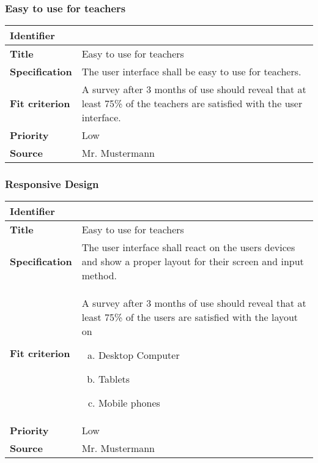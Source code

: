 
\newenvironment{requirement}[1]{
	\subsubsection{#1}
	\label{req:#1}

	\newcommand{\header}[1]{\textbf{##1}}

	\newcommand{\Identifier}{\hline \header{Identifier} & \header{\thesubsubsection} \\}
	\newcommand{\Title}{\hline \header{Title} & #1 \\}
	\newcommand{\Specification}[1]{\hline \header{Specification} & ##1 \\}
	\newcommand{\Category}[1]{\hline \header{Category} & ##1 \\}
	\newcommand{\FitCriterion}[1]{\hline \header{Fit criterion} & ##1 \\}
	\newcommand{\Source}[1]{\hline \header{Source} & ##1 \\}
	\newcommand{\Rationale}[1]{\hline \header{Rationale} & ##1 \\}
	\newcommand{\Interaction}[1]{\hline \header{Interaction} & ##1 \\}
	\newcommand{\Priority}[1]{\hline \header{Priority} & ##1 \\}
	\newcommand{\Stability}[1]{\hline \header{Stability} & ##1 \\}
	\newcommand{\High}{\Priority{Essential}}
	\newcommand{\Medium}{\Priority{Medium}}
	\newcommand{\Low}{\Priority{Low}}

	\begin{tabular}{|p{0.3\textwidth}|p{0.7\textwidth}|}
		\Identifier
		\Title
}
{
		\Source{\Client}
		\hline
	\end{tabular}
}
\setcounter{secnumdepth}{3}
\newcommand{\Client}{Mr. Mustermann}
\newcommand{\TBD}{TBD}
\newcommand{\reqref}[1]{\ref{req:#1}}


\begin{requirement}{Easy to use for teachers}
	\Specification{The user interface shall be easy to use for teachers.}
	\FitCriterion{
		A survey after 3 months of use should reveal that at least 75\% of the teachers are satisfied with the user interface.
	}
	\Low
\end{requirement}

\begin{requirement}{Responsive Design}
	\Specification{The user interface shall react on the users devices and show a proper layout for their screen and input method.}
	\FitCriterion{
		A survey after 3 months of use should reveal that at least 75\% of the users are satisfied with the layout on
		\begin{enumerate}[(a)]
			\item Desktop Computer
			\item Tablets
			\item Mobile phones
		\end{enumerate}
	}
	\Low
\end{requirement}
